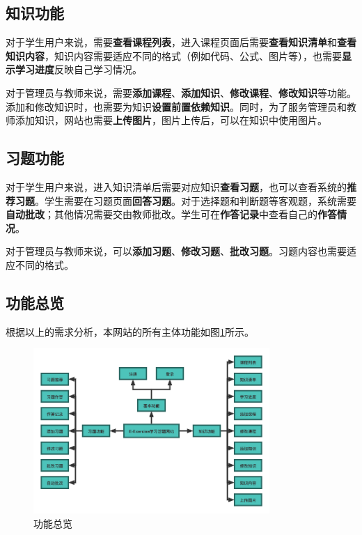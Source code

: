 \documentclass{nwafucoursepaper}
\begin{document}
\subsection{知识功能}

对于学生用户来说，需要\textbf{查看课程列表}，进入课程页面后需要\textbf{查看知识清单}和\textbf{查看知识内容}，知识内容需要适应不同的格式（例如代码、公式、图片等），也需要\textbf{显示学习进度}反映自己学习情况。

对于管理员与教师来说，需要\textbf{添加课程}、\textbf{添加知识}、\textbf{修改课程}、\textbf{修改知识}等功能。添加和修改知识时，也需要为知识\textbf{设置前置依赖知识}。同时，为了服务管理员和教师添加知识，网站也需要\textbf{上传图片}，图片上传后，可以在知识中使用图片。

\subsection{习题功能}

对于学生用户来说，进入知识清单后需要对应知识\textbf{查看习题}，也可以查看系统的\textbf{推荐习题}。学生需要在习题页面\textbf{回答习题}。对于选择题和判断题等客观题，系统需要\textbf{自动批改}；其他情况需要交由教师批改。学生可在\textbf{作答记录}中查看自己的\textbf{作答情况}。

对于管理员与教师来说，可以\textbf{添加习题}、\textbf{修改习题}、\textbf{批改习题}。习题内容也需要适应不同的格式。

\subsection{功能总览}

根据以上的需求分析，本网站的所有主体功能如图\ref{功能总览图}所示。

\begin{figure}[htp]
  \centering
  \includegraphics[width=0.8\textwidth]{功能总览图.png}
  \caption{功能总览}
  \label{功能总览图}
\end{figure}
\end{document}
